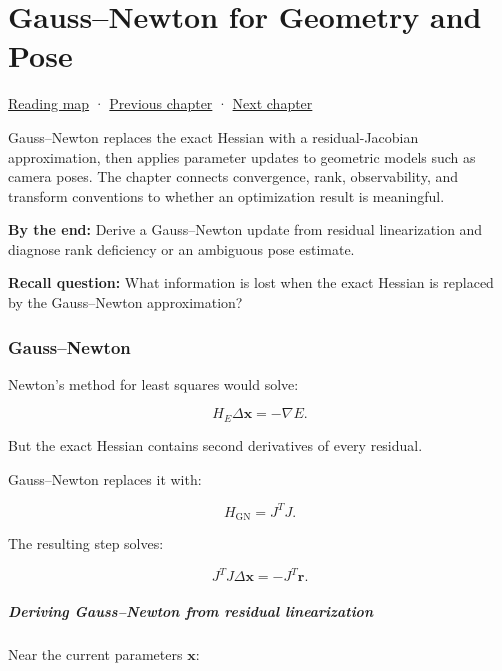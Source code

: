 \hypertarget{02-foundations-ii-ch027}{}
\chapter{Gauss--Newton for Geometry and Pose}\label{stagechapter:02-foundations-ii-ch027}\label{02-foundations-ii-ch027-gaussnewton-for-geometry-and-pose}

\hyperref[volume-reading-map]{Reading map} · \hyperref[02-foundations-ii-ch026-matrix-functions-and-nonlinear-least-squares]{Previous chapter} · \hyperref[02-foundations-ii-ch028-reliable-optimization-and-root-finding]{Next chapter}

Gauss--Newton replaces the exact Hessian with a residual-Jacobian approximation, then applies parameter updates to geometric models such as camera poses. The chapter connects convergence, rank, observability, and transform conventions to whether an optimization result is meaningful.

\textbf{By the end:} Derive a Gauss--Newton update from residual linearization and diagnose rank deficiency or an ambiguous pose estimate.

\textbf{Recall question:} What information is lost when the exact Hessian is replaced by the Gauss--Newton approximation?

\subsection{Gauss--Newton}\label{02-foundations-ii-ch027-gaussnewton}

Newton's method for least squares would solve:

\[
H_E\Delta\mathbf x=-\nabla E.
\]

But the exact Hessian contains second derivatives of every residual.

Gauss--Newton replaces it with:

\[
H_{\mathrm{GN}}=J^TJ.
\]

The resulting step solves:

\[
\boxed{ J^TJ\Delta\mathbf x=-J^T\mathbf r }.
\]

\paragraph{Deriving Gauss--Newton from residual linearization}\label{02-foundations-ii-ch027-deriving-gaussnewton-from-residual-linearization}

Near the current parameters \(\mathbf x\):

